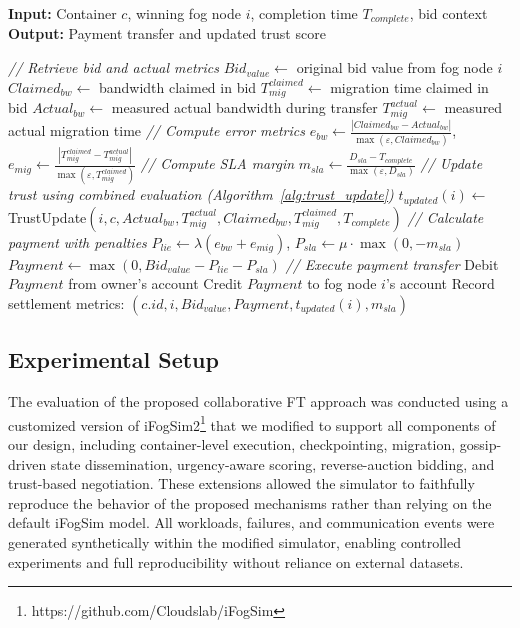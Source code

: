 \documentclass{article}
\begin{document}
\begin{algorithm}[t]
\caption{Payment Settlement and Combined Trust Update}
\label{alg:payment_settlement}
\textbf{Input:} Container $c$, winning fog node $i$, completion time $T_{complete}$, bid context \\
\textbf{Output:} Payment transfer and updated trust score 
\begin{algorithmic}[1]
\State \textit{// Retrieve bid and actual metrics}
\State $Bid_{value} \gets$ original bid value from fog node $i$
\State $Claimed_{bw} \gets$ bandwidth claimed in bid
\State $T^{claimed}_{mig} \gets$ migration time claimed in bid
\State $Actual_{bw} \gets$ measured actual bandwidth during transfer
\State $T^{actual}_{mig} \gets$ measured actual migration time
\State
\State \textit{// Compute error metrics}
\State $e_{bw} \gets \frac{|Claimed_{bw} - Actual_{bw}|}{\max(\varepsilon, Claimed_{bw})}$, $e_{mig} \gets \frac{|T^{claimed}_{mig} - T^{actual}_{mig}|}{\max(\varepsilon, T^{claimed}_{mig})}$
\State
\State \textit{// Compute SLA margin}
\State $m_{sla} \gets \frac{D_{sla} - T_{complete}}{\max(\varepsilon, D_{sla})}$
\State
\State \textit{// Update trust using combined evaluation (Algorithm~\ref{alg:trust_update})}
\State $t_{updated}(i) \gets$ TrustUpdate$(i, c, Actual_{bw}, T^{actual}_{mig}, Claimed_{bw}, T^{claimed}_{mig}, T_{complete})$
\State
\State \textit{// Calculate payment with penalties}
\State $P_{lie} \gets \lambda (e_{bw} + e_{mig})$, $P_{sla} \gets \mu \cdot \max(0, -m_{sla})$
\State
\State $Payment \gets \max(0, Bid_{value} - P_{lie} - P_{sla})$
\State
\State \textit{// Execute payment transfer}
    \State Debit $Payment$ from owner's account
    \State Credit $Payment$ to fog node $i$'s account
\EndIf
\State
\State Record settlement metrics: $(c.id, i, Bid_{value}, Payment, t_{updated}(i), m_{sla})$
\end{algorithmic}
\end{algorithm}

\subsection{Experimental Setup}

The evaluation of the proposed collaborative FT approach was conducted using a customized version of iFogSim2\footnote{https://github.com/Cloudslab/iFogSim} that we modified to support all components of our design, including container-level execution, checkpointing, migration, gossip-driven state dissemination, urgency-aware scoring, reverse-auction bidding, and trust-based negotiation. These extensions allowed the simulator to faithfully reproduce the behavior of the proposed mechanisms rather than relying on the default iFogSim model. All workloads, failures, and communication events were generated synthetically within the modified simulator, enabling controlled experiments and full reproducibility without reliance on external datasets.
\end{document}
